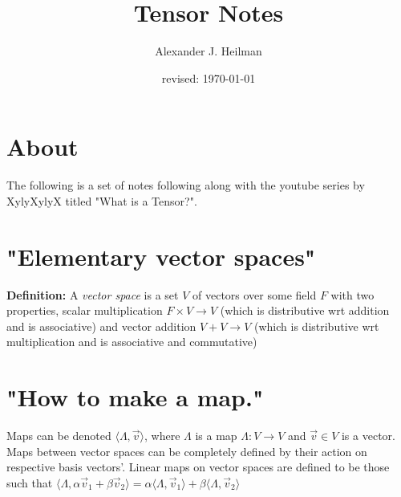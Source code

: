 \documentclass{article}\usepackage[]{graphicx}\usepackage[]{color}
\title{Tensor Notes}%
\author{Alexander J. Heilman}%
\date{revised: \today}%
\begin{document}
\maketitle


\tableofcontents


\section*{About}
The following is a set of notes following along with the youtube series by XylyXylyX titled "What is a Tensor?".

\section{"Elementary vector spaces"}

\textbf{Definition:} A \textit{vector space} is a set $V$ of vectors over some field $F$ with two properties, scalar multiplication $F\times V \rightarrow V$ (which is distributive wrt addition and is associative) and vector addition $V+V\rightarrow V$ (which is distributive wrt multiplication and is associative and commutative)

\section{"How to make a map."}

Maps can be denoted $\langle \Lambda , \vec{v}  \rangle$,
where $\Lambda$ is a map $\Lambda : V\rightarrow V$ and $\vec{v}\in V$ is a vector. Maps between vector spaces can be completely defined by their action on respective basis vectors'. Linear maps on vector spaces are defined to be those such that $\langle \Lambda , \alpha \vec{v}_1 + \beta \vec{v}_2\rangle =\alpha \langle \Lambda , \vec{v}_1 \rangle +\beta\langle\Lambda, \vec{v}_2\rangle$
\end{document}
